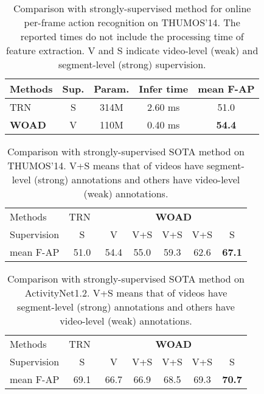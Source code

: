 \documentclass[final]{cvpr}
\begin{document}
\begin{table}[ht]
    \centering
    \begin{tabular}{l|c||c|c|c}
        Methods & Sup. & Param.  & Infer time& mean F-AP\\
        \midrule
        TRN~\cite{xu2019trn}& S
        &314M &2.60 ms &51.0\\
        \midrule
        \textbf{WOAD} & V &110M&0.40 ms&\textbf{54.4}\\
    \end{tabular}
    \caption{Comparison with strongly-supervised method for online per-frame action recognition on THUMOS'14. The reported times do not include the processing time of feature extraction. V and S indicate video-level (weak) and segment-level (strong) supervision.}
    \label{tab: thumos_frame}
\end{table}
\begin{table*}[ht]
    \centering
    \begin{tabular}{l|c|c|c|c|c|c|}
    Methods  & TRN~\cite{xu2019trn}& \multicolumn{5}{c|}{\textbf{WOAD}}\\
    Supervision  &S & V&V+S&V+S& V+S& S \\
    \midrule
    mean F-AP  &51.0&54.4&55.0& 59.3& 62.6&\textbf{67.1} \\
    \end{tabular}
    \caption{Comparison with strongly-supervised SOTA method on THUMOS'14. V+S means that  of videos have segment-level (strong) annotations and others have video-level (weak) annotations.}
    \label{tab: thumos_mix}
\end{table*}
\begin{table*}[ht]
    \centering
    \begin{tabular}{l|c|c|c|c|c|c|}
    Methods  & TRN~\cite{xu2019trn}& \multicolumn{5}{c|}{\textbf{WOAD}}\\
    Supervision  &S & V&V+S&V+S& V+S& S \\
    \midrule
    mean F-AP  &69.1&66.7&66.9& 68.5& 69.3&\textbf{70.7} \\

    \end{tabular}
    \caption{Comparison with strongly-supervised SOTA method on ActivityNet1.2. V+S means that  of videos have segment-level (strong) annotations and others have video-level (weak) annotations.}
    \label{tab: anet_frame}
\end{table*}
\end{document}
